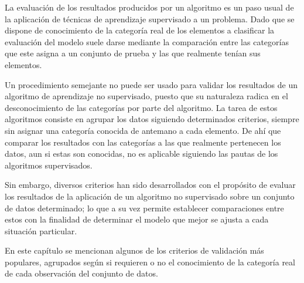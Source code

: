 La evaluación de los resultados producidos por un algoritmo es un paso usual de la aplicación de técnicas de aprendizaje supervisado a un problema.
Dado que se dispone de conocimiento de la categoría real de los elementos a clasificar la evaluación del modelo suele darse mediante la comparación entre las categorías que este asigna a un conjunto de prueba y las que realmente tenían sus elementos.

Un procedimiento semejante no puede ser usado para validar los resultados de un algoritmo de aprendizaje no supervisado, puesto que su naturaleza radica en el desconocimiento de las categorías por parte del algoritmo.
La tarea de estos algoritmos consiste en agrupar los datos siguiendo determinados criterios, siempre sin asignar una categoría conocida de antemano a cada elemento.
De ahí que comparar los resultados con las categorías a las que realmente pertenecen los datos, aun si estas son conocidas, no es aplicable siguiendo las pautas de los algoritmos supervisados.

Sin embargo, diversos criterios han sido desarrollados con el propósito de evaluar los resultados de la aplicación de un algoritmo no supervisado sobre un conjunto de datos determinado;
lo que a su vez permite establecer comparaciones entre estos con la finalidad de determinar el modelo que mejor se ajusta a cada situación particular.

En este capítulo se mencionan algunos de los criterios de validación más populares, agrupados según si requieren o no el conocimiento de la categoría real de cada observación del conjunto de datos.


